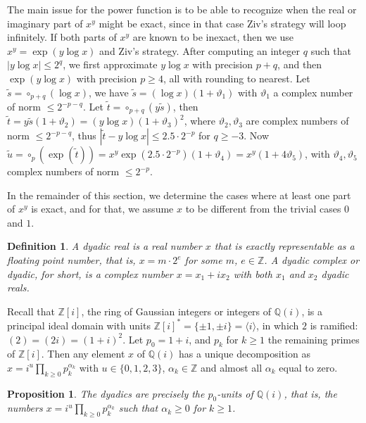 \documentclass [11pt]{article}
\newcommand {\round}{\operatorname {\circ}}
\newcommand {\Z}{\mathbb Z}
\newcommand {\Q}{\mathbb Q}
\renewcommand {\theta}{\vartheta}
\renewcommand {\leq}{\leqslant}
\renewcommand {\geq}{\geqslant}
\newtheorem{definition}[theorem]{Definition}
\newtheorem{prop}[theorem]{Proposition}
\begin{document}
The main issue for the power function is to be able to recognize when the
real or imaginary part of $x^y$ might be exact, since in that case
Ziv's strategy will loop infinitely.
If both parts of $x^y$ are known to be inexact, then we use
$x^y = \exp(y \log x)$ and Ziv's strategy.
After computing an integer $q$ such that $|y \log x| \leq 2^q$, we first
approximate $y \log x$ with precision $p + q$, and then
$\exp(y \log x)$ with precision $p \geq 4$, all with rounding
to nearest.
Let $\tilde{s} = \round_{p+q}(\log x)$,
we have $\tilde{s} = (\log x) (1 + \theta_1)$
with $\theta_1$ a complex number of norm $\leq 2^{-p-q}$.
Let $\tilde{t} = \round_{p+q}(y \tilde{s})$, then
$\tilde{t} = y \tilde{s} (1 + \theta_2) = (y \log x) (1 + \theta_3)^2$,
where $\theta_2, \theta_3$ are complex numbers of norm $\leq 2^{-p-q}$,
thus $|\tilde{t} - y \log x| \leq 2.5 \cdot 2^{-p}$ for $q \geq -3$.
Now $\tilde{u} = \round_p(\exp(\tilde{t})) =
x^y \exp(2.5 \cdot 2^{-p}) (1 + \theta_4) = x^y (1 + 4 \theta_5)$,
with $\theta_4, \theta_5$ complex numbers of norm $\leq 2^{-p}$.

In the remainder of this section, we determine the cases where at
least one part of $x^y$ is exact, and for that, we assume $x$ to be
different from the trivial cases $0$ and $1$.

\begin {definition}
A {\em dyadic real} is a real number $x$ that is exactly representable
as a floating point number, that is, $x = m \cdot 2^e$ for some $m$, $e \in \Z$.
A {\em dyadic complex} or {\em dyadic}, for short, is a complex number
$x = x_1 + i x_2$ with both $x_1$ and $x_2$ dyadic reals.
\end {definition}

Recall that $\Z [i]$, the ring of Gaussian integers or integers of $\Q (i)$,
is a principal ideal domain with units
$\Z [i]^\ast = \{ \pm 1, \pm i \} = \langle i \rangle$,
in which $2$ is ramified: $(2) = (2 i) = (1 + i)^2$. Let $p_0 = 1 + i$, and
$p_k$ for $k \geq 1$ the remaining primes of $\Z [i]$. Then any element
$x$ of $\Q (i)$ has a unique decomposition as
$x = i^u \prod_{k \geq 0} p_k^{\alpha_k}$ with $u \in \{ 0, 1, 2, 3\}$,
$\alpha_k \in \Z$ and almost all $\alpha_k$ equal to zero.

\begin {prop}
\label {prop:dyadic}
The dyadics are precisely the $p_0$-units of $\Q (i)$, that is,
the numbers $x = i^u \prod_{k \geq 0} p_k^{\alpha_k}$
such that $\alpha_k \geq 0$ for $k \geq 1$.
\end {prop}
\end{document}
